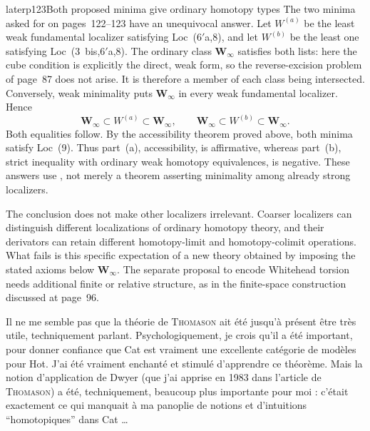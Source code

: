 \begin{dcomment}{later}{p123}{Both proposed minima give ordinary homotopy types}
The two minima asked for on pages~122--123 have an unequivocal answer. Let $W^{(a)}$ be the least weak fundamental localizer satisfying Loc~(6$'$a,8), and let $W^{(b)}$ be the least one satisfying Loc~(3~bis,6$'$a,8). The ordinary class $\mathbf W_\infty$ satisfies both lists: here the cube condition is explicitly the direct, weak form, so the reverse-excision problem of page~87 does not arise. It is therefore a member of each class being intersected. Conversely, weak minimality puts $\mathbf W_\infty$ in every weak fundamental localizer. Hence
\[
 \mathbf W_\infty\subset W^{(a)}\subset\mathbf W_\infty,
 \qquad
 \mathbf W_\infty\subset W^{(b)}\subset\mathbf W_\infty.
\]
Both equalities follow. By the accessibility theorem proved above, both minima satisfy Loc~(9). Thus part~(a), accessibility, is affirmative, whereas part~(b), strict inequality with ordinary weak homotopy equivalences, is negative. These answers use \citet[Theorem~6.1.18]{Cisinski2006}, not merely a theorem asserting minimality among already strong localizers.

The conclusion does not make other localizers irrelevant. Coarser localizers can distinguish different localizations of ordinary homotopy theory, and their derivators can retain different homotopy-limit and homotopy-colimit operations. What fails is this specific expectation of a new theory obtained by imposing the stated axioms below $\mathbf W_\infty$. The separate proposal to encode Whitehead torsion needs additional finite or relative structure, as in the finite-space construction discussed at page~96.
\end{dcomment}


Il ne me semble pas que la théorie de \textsc{Thomason} ait été jusqu'à présent être très utile, techniquement parlant. Psychologiquement, je crois qu'il a été important, pour donner confiance que Cat est vraiment une excellente catégorie de modèles pour Hot. J'ai été vraiment enchanté et stimulé d'apprendre ce théorème. Mais la notion d'application de Dwyer (que j'ai apprise en 1983 dans l'article de \textsc{Thomason}) a été, techniquement, beaucoup plus importante pour moi : c'était exactement ce qui manquait à ma panoplie de notions et d'intuitions ``homotopiques'' dans Cat \dots



